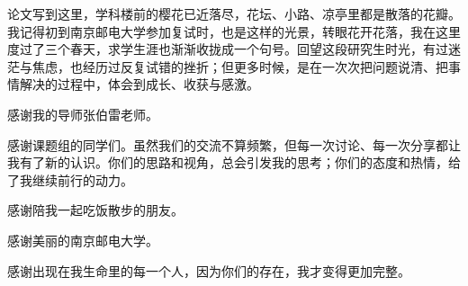 \begin{thanks}
  论文写到这里，学科楼前的樱花已近落尽，花坛、小路、凉亭里都是散落的花瓣。我记得初到南京邮电大学参加复试时，也是这样的光景，转眼花开花落，我在这里度过了三个春天，求学生涯也渐渐收拢成一个句号。回望这段研究生时光，有过迷茫与焦虑，也经历过反复试错的挫折；但更多时候，是在一次次把问题说清、把事情解决的过程中，体会到成长、收获与感激。

  感谢我的导师张伯雷老师。

  感谢课题组的同学们。虽然我们的交流不算频繁，但每一次讨论、每一次分享都让我有了新的认识。你们的思路和视角，总会引发我的思考；你们的态度和热情，给了我继续前行的动力。

  感谢陪我一起吃饭散步的朋友。

  感谢美丽的南京邮电大学。

  感谢出现在我生命里的每一个人，因为你们的存在，我才变得更加完整。

\end{thanks}
